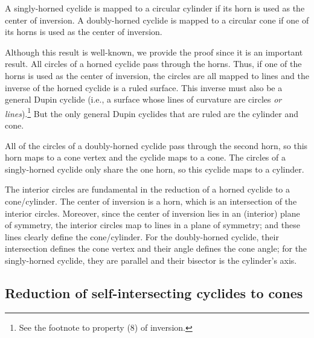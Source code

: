 \begin{lemma}
\label{lem:horn}
A singly-horned cyclide is mapped to a circular cylinder 
if its horn is used as the center of inversion.
A doubly-horned cyclide is mapped to a circular cone
if one of its horns is used as the center of inversion.
\end{lemma}
\prf
Although this result is well-known, 
we provide the proof since it is an important result.
All circles of a horned cyclide pass through the horns.
Thus, if one of the horns is used as the center of inversion,
the circles are all mapped to lines and 
the inverse of the horned cyclide is a ruled surface.
This inverse must also be a general
Dupin cyclide (i.e., a surface whose lines of curvature are circles 
{\em or lines}).\footnote{See the footnote to property (8) of inversion.}
But the only general Dupin cyclides that are ruled are the cylinder and cone.

All of the circles of a doubly-horned cyclide pass through the second horn,
so this horn maps to a cone vertex and the cyclide maps to a cone.
The circles of a singly-horned cyclide only share the one horn,
so this cyclide maps to a cylinder.
\QED

\begin{rmk}
\label{rmk:interior}
The interior circles are fundamental in the reduction of a horned cyclide
to a cone/cylinder.
The center of inversion is a horn, which is an intersection of the interior
circles.
Moreover, since the center of inversion lies in an (interior) plane of
symmetry, the interior circles map to lines in a plane of symmetry;
and these lines clearly define the cone/cylinder.
For the doubly-horned cyclide, their intersection defines the cone vertex
and their angle defines the cone angle;
for the singly-horned cyclide, they are parallel and their bisector
is the cylinder's axis.
\end{rmk}


\subsection{Reduction of self-intersecting cyclides to cones}
\label{sec:tocone}


